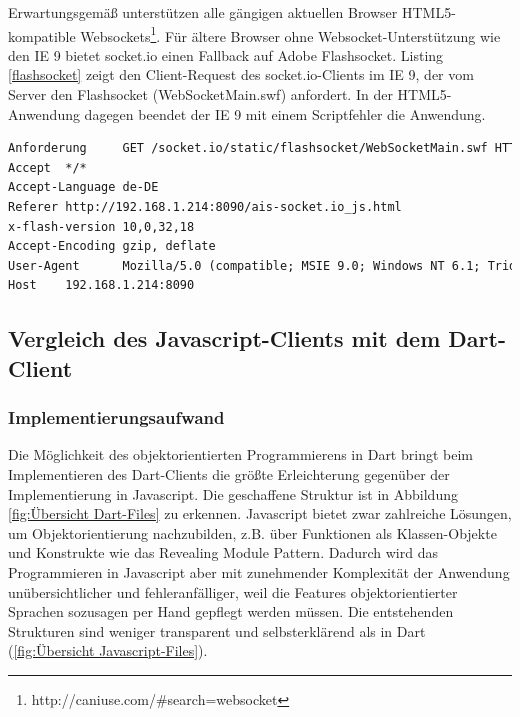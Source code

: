 Erwartungsgemäß unterstützen alle gängigen aktuellen Browser HTML5-kompatible Websockets\footnote{http://caniuse.com/\#search=websocket}. Für ältere Browser ohne Websocket-Unterstützung wie den IE 9 bietet socket.io einen Fallback auf Adobe Flashsocket. Listing \ref{flashsocket} zeigt den Client-Request des socket.io-Clients im IE 9, der vom Server den Flashsocket (WebSocketMain.swf) anfordert. In der HTML5-Anwendung dagegen beendet der IE 9  mit einem Scriptfehler die Anwendung.\\
\begin{lstlisting}[language=html,caption=socket.io Client-Request in Internet Explorer 9, label=flashsocket]
Anforderung     GET /socket.io/static/flashsocket/WebSocketMain.swf HTTP/1.1
Accept  */*
Accept-Language de-DE
Referer http://192.168.1.214:8090/ais-socket.io_js.html
x-flash-version 10,0,32,18
Accept-Encoding gzip, deflate
User-Agent      Mozilla/5.0 (compatible; MSIE 9.0; Windows NT 6.1; Trident/5.0)
Host    192.168.1.214:8090                            
\end{lstlisting}

\newpage
\subsection{Vergleich des Javascript-Clients mit dem Dart-Client} 
\subsubsection{Implementierungsaufwand}
Die Möglichkeit des objektorientierten Programmierens in Dart bringt beim Implementieren des Dart-Clients die größte Erleichterung gegenüber der Implementierung in Javascript. Die geschaffene Struktur ist in Abbildung \ref{fig:Übersicht Dart-Files} zu erkennen. Javascript bietet zwar zahlreiche Lösungen, um Objektorientierung nachzubilden, z.B. über Funktionen als Klassen-Objekte und Konstrukte wie das Revealing Module Pattern. Dadurch wird das Programmieren in Javascript aber mit zunehmender Komplexität der Anwendung unübersichtlicher und fehleranfälliger, weil die Features objektorientierter Sprachen sozusagen per Hand gepflegt werden müssen. Die entstehenden Strukturen sind weniger transparent und selbsterklärend als in Dart (\ref{fig:Übersicht Javascript-Files}).\\

